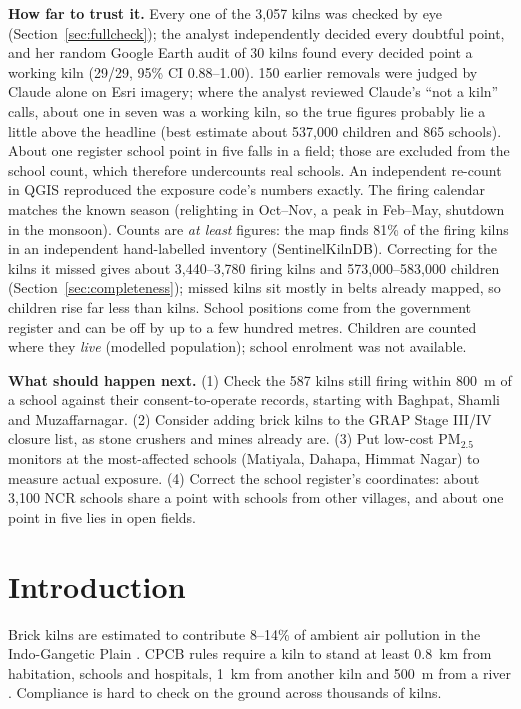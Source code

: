 \documentclass[11pt,a4paper]{article}
\begin{document}
\textbf{How far to trust it.} Every one of the 3{,}057 kilns was checked by eye
(Section~\ref{sec:fullcheck}); the analyst independently decided every doubtful
point, and her random Google Earth audit of 30 kilns found every decided point a
working kiln (29/29, 95\% CI 0.88--1.00). 150 earlier removals were judged by
Claude alone on Esri imagery; where the analyst reviewed Claude's ``not a kiln''
calls, about one in seven was a working kiln, so the true figures probably lie a
little above the headline (best estimate about 537{,}000 children and 865
schools). About one register school point in five falls in a field; those are
excluded from the school count, which therefore undercounts real schools.
An independent re-count in QGIS reproduced the exposure code's numbers exactly.
The firing calendar matches the known season (relighting in Oct--Nov, a peak in
Feb--May, shutdown in the monsoon). Counts are \emph{at least} figures: the map
finds 81\% of the firing kilns in an independent hand-labelled inventory
(SentinelKilnDB). Correcting for the kilns it missed gives about 3{,}440--3{,}780
firing kilns and 573{,}000--583{,}000 children (Section~\ref{sec:completeness});
missed kilns sit mostly in belts already mapped, so children rise far less than
kilns. School positions
come from the government register and can be off by up to a few hundred metres.
Children are counted where they \emph{live} (modelled population); school
enrolment was not available.

\textbf{What should happen next.} (1) Check the 587 kilns still firing within
800~m of a school against their consent-to-operate records, starting with
Baghpat, Shamli and Muzaffarnagar. (2) Consider adding brick kilns to the GRAP
Stage III/IV closure list, as stone crushers and mines already are. (3) Put
low-cost PM$_{2.5}$ monitors at the most-affected schools (Matiyala, Dahapa,
Himmat Nagar) to measure actual exposure. (4) Correct the school register's
coordinates: about 3{,}100 NCR schools share a point with schools from other
villages, and about one point in five lies in open fields.

\section{Introduction}

Brick kilns are estimated to contribute 8--14\% of ambient air pollution in the
Indo-Gangetic Plain \cite{mondal2025}. CPCB rules require a kiln to stand at
least 0.8~km from habitation, schools and hospitals, 1~km from another kiln and
500~m from a river \cite{cpcb2022}. Compliance is hard to check on the ground
across thousands of kilns.
\end{document}
